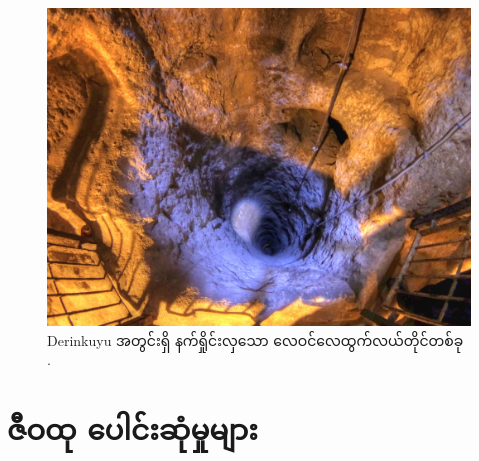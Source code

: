 \documentclass[10pt,twocolumn,letterpaper]{article}
\begin{document}
\begin{figure}[t]
\begin{center}
   \includegraphics[width=1\linewidth]{derinkuyu-air.jpg}
\end{center}
   \caption{Derinkuyu အတွင်းရှိ နက်ရှိုင်းလှသော လေဝင်လေထွက်လယ်တိုင်တစ်ခု \cite{53}.}
\label{fig:6}

\label{fig:onecol}
\end{figure}



\section{ဇီဝထု ပေါင်းဆုံမှုများ}
\end{document}
